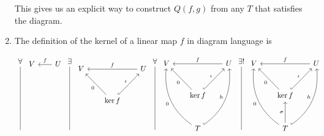 \documentclass[12pt]{amsart}
\theoremstyle{definition}
\DeclareMathOperator{\kernel}{\mathrm{ker}}
\begin{document}
\begin{enumerate}
This gives us an explicit way to construct $Q(f,g)$ from any $T$ that satisfies the diagram.\\

\item The definition of the kernel of a linear map $f$ in diagram language is

\[
    \begin{tikzcd}[row sep=1cm, column sep=.7cm]
     \forall\arrow[ddd, dash]\\
     \\
     \\
     \;
    \end{tikzcd} 
    \begin{tikzcd}[row sep=1cm, column sep=.65cm]
     V& U\arrow[l,"f"']\\
     &\\
     &\\
    \end{tikzcd}
    \begin{tikzcd}[row sep=1cm, column sep=.7cm]
     \exists\arrow[ddd, dash]\\
     \\
     \\
     \;
    \end{tikzcd} 
    \begin{tikzcd}[row sep=1cm, column sep=.65cm]
     V&& U\arrow[ll,"f"']\\
     &\kernel f\arrow[ur, hook, "\iota"]\arrow[ul, "0"]&\\
     & & 
    \end{tikzcd}
    \begin{tikzcd}[row sep=1cm, column sep=.7cm]
     \forall\arrow[ddd, dash,]\\
     \\
     \\
     \;
    \end{tikzcd}
    \begin{tikzcd}[row sep=1cm, column sep=.65cm]
     V&& U\arrow[ll,"f"']\\
     &\kernel f\arrow[ur, hook, "\iota"]\arrow[ul, "0"]&\\
     & T\arrow[uur, hook, "h", bend right]\arrow[uul, "0", bend left]& 
    \end{tikzcd}
    \begin{tikzcd}[row sep=1cm, column sep=.7cm]
     \exists!\arrow[ddd, dash]\\
     \\
     \\
     \;
    \end{tikzcd}
    \begin{tikzcd}[row sep=1cm, column sep=.65cm]
     V&& U\arrow[ll,"f"']\\
     &\kernel f\arrow[ur, hook, "\iota"]\arrow[ul, "0"]&\\
     & T\arrow[uur, hook, "h", bend right]\arrow[uul, "0", bend left]\arrow[u, "\sigma"]& 
    \end{tikzcd}
    \]


\end{enumerate}
\end{document}

